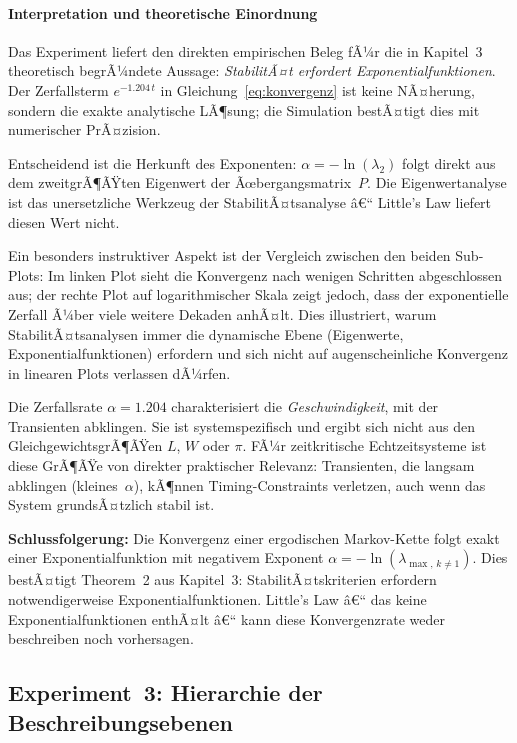 ﻿\documentclass[a4paper,12pt]{report}
\theoremstyle{definition}
\begin{document}
\paragraph{Interpretation und theoretische Einordnung}

Das Experiment liefert den direkten empirischen Beleg fÃ¼r die in
Kapitel~3 theoretisch begrÃ¼ndete Aussage: \emph{StabilitÃ¤t erfordert
	Exponentialfunktionen}.  Der Zerfallsterm $e^{-1.204\,t}$ in
Gleichung~\eqref{eq:konvergenz} ist keine NÃ¤herung, sondern die exakte
analytische LÃ¶sung; die Simulation bestÃ¤tigt dies mit numerischer
PrÃ¤zision.

Entscheidend ist die Herkunft des Exponenten: $\alpha = -\ln(\lambda_2)$
folgt direkt aus dem zweitgrÃ¶ÃŸten Eigenwert der Ãœbergangsmatrix~$P$.
Die Eigenwertanalyse ist das unersetzliche Werkzeug der
StabilitÃ¤tsanalyse â€“ Little's Law liefert diesen Wert nicht.

Ein besonders instruktiver Aspekt ist der Vergleich zwischen den
beiden Sub-Plots: Im linken Plot sieht die Konvergenz nach wenigen
Schritten abgeschlossen aus; der rechte Plot auf logarithmischer
Skala zeigt jedoch, dass der exponentielle Zerfall Ã¼ber viele weitere
Dekaden anhÃ¤lt.  Dies illustriert, warum StabilitÃ¤tsanalysen immer
die dynamische Ebene (Eigenwerte, Exponentialfunktionen) erfordern
und sich nicht auf augenscheinliche Konvergenz in linearen Plots
verlassen dÃ¼rfen.

Die Zerfallsrate $\alpha = 1.204$ charakterisiert die
\emph{Geschwindigkeit}, mit der Transienten abklingen.  Sie ist
systemspezifisch und ergibt sich nicht aus den GleichgewichtsgrÃ¶ÃŸen
$L$, $W$ oder $\pi$.  FÃ¼r zeitkritische Echtzeitsysteme ist diese
GrÃ¶ÃŸe von direkter praktischer Relevanz: Transienten, die langsam
abklingen (kleines~$\alpha$), kÃ¶nnen Timing-Constraints verletzen,
auch wenn das System grundsÃ¤tzlich stabil ist.

\textbf{Schlussfolgerung:} Die Konvergenz einer ergodischen
Markov-Kette folgt exakt einer Exponentialfunktion mit negativem
Exponent $\alpha = -\ln(\lambda_{\max,\,k \neq 1})$.  Dies bestÃ¤tigt
Theorem~2 aus Kapitel~3: StabilitÃ¤tskriterien erfordern notwendigerweise
Exponentialfunktionen.  Little's Law â€“ das keine Exponentialfunktionen
enthÃ¤lt â€“ kann diese Konvergenzrate weder beschreiben noch vorhersagen.

\subsection{Experiment~3: Hierarchie der Beschreibungsebenen}
\label{subsubsec:exp3}
\end{document}
